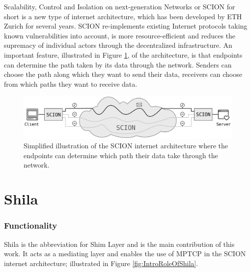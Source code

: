 Scalability, Control and Isolation on next-generation Networks or SCION for short is a new type of internet architecture, which has been developed by ETH Zurich for several years. SCION re-implements existing Internet protocols taking known vulnerabilities into account, is more resource-efficient and reduces the supremacy of individual actors through the decentralized infrastructure. An important feature, illustrated in Figure \ref{fig:IntroSCION}, of the architecture, is that endpoints can determine the path taken by its data through the network. Senders can choose the path along which they want to send their data, receivers can choose from which paths they want to receive data.
\begin{figure}[H]
	\begin{center}
		\def\svgwidth{1\textwidth}
		\includegraphics[scale=0.28]{../illustrations/introduction/SCION.pdf}
		\caption[Caption for the list of figures.]{Simplified illustration of the SCION internet architecture where the endpoints can determine which path their data take through the network.}
		\label{fig:IntroSCION}
	\end{center}
\end{figure}

\section{Shila}

\subsubsection{Functionality}

Shila is the abbreviation for Shim Layer and is the main contribution of this work. It acts as a mediating layer and enables the use of MPTCP in the SCION internet architecture; illustrated in Figure \ref{fig:IntroRoleOfShila}. 

